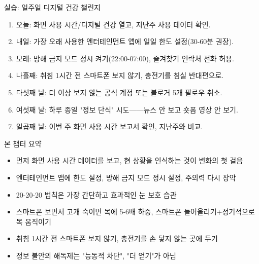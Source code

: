 \begin{tcbpractice}{실습: 일주일 디지털 건강 챌린지}
\begin{enumerate}
  \item 오늘: 화면 사용 시간/디지털 건강 열고, 지난주 사용 데이터 확인.
  \item 내일: 가장 오래 사용한 엔터테인먼트 앱에 일일 한도 설정(30-60분 권장).
  \item 모레: 방해 금지 모드 정시 켜기(22:00-07:00), 즐겨찾기 연락처 전화 허용.
  \item 나흘째: 취침 1시간 전 스마트폰 보지 않기, 충전기를 침실 반대편으로.
  \item 다섯째 날: 더 이상 보지 않는 공식 계정 또는 블로거 5개 팔로우 취소.
  \item 여섯째 날: 하루 종일 "정보 단식" 시도——뉴스 안 보고 숏폼 영상 안 보기.
  \item 일곱째 날: 이번 주 화면 사용 시간 보고서 확인, 지난주와 비교.
\end{enumerate}

\end{tcbpractice}

\begin{tcbsummary}{본 챕터 요약}
\begin{itemize}
  \item 먼저 화면 사용 시간 데이터를 보고, 현 상황을 인식하는 것이 변화의 첫 걸음
  \item 엔터테인먼트 앱에 한도 설정, 방해 금지 모드 정시 설정, 주의력 다시 장악
  \item 20-20-20 법칙은 가장 간단하고 효과적인 눈 보호 습관
  \item 스마트폰 보면서 고개 숙이면 목에 5-6배 하중, 스마트폰 들어올리기+정기적으로 목 움직이기
  \item 취침 1시간 전 스마트폰 보지 않기, 충전기를 손 닿지 않는 곳에 두기
  \item 정보 불안의 해독제는 "능동적 차단", "더 얻기"가 아님
\end{itemize}

\end{tcbsummary}
